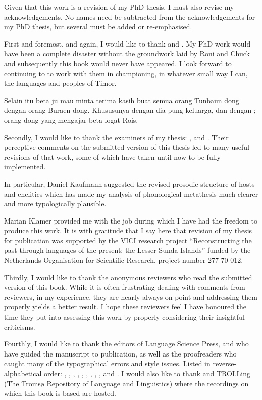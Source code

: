 \begin{refsection}

Given that this work is a revision of my PhD thesis,
I must also revise my acknowledgements.
No names need be subtracted from the acknowledgements for my PhD thesis,
but several must be added or re-emphasised.

First and foremost, and again, I would like to thank
 and .
My PhD work would have been a complete disaster without
the groundwork laid by Roni and Chuck and
subsequently this book would never have appeared.
I look forward to continuing to to work with them in championing,
in whatever small way I can, the languages and peoples of Timor.

Selain itu beta ju mau minta terima kasih buat semua
orang Tunbaun dong dengan orang Buraen dong.
Khususunya  dengan dia pung keluarga,
dan  dengan ;
orang dong yang mengajar beta logat Ro{\Q}is.

Secondly, I would like to thank the examiners of my thesis:
,  and .
Their perceptive comments on the submitted version of this thesis
led to many useful revisions of that work, some of which have
taken until now to be fully implemented.

In particular, Daniel Kaufmann suggested
the revised prosodic structure of hosts and enclitics which
has made my analysis of phonological metathesis much clearer
and more typologically plausible.

Marian Klamer provided me with the job during
which I have had the freedom to produce this work.
It is with gratitude that I say here that
revision of my thesis for publication was supported
by the VICI research project ``Reconstructing the past
through languages of the present: the Lesser Sunda Islands''
funded by the Netherlands Organisation for Scientific
Research, project number 277-70-012.

Thirdly, I would like to thank the anonymous reviewers
who read the submitted version of this book.
While it is often frustrating dealing with comments from reviewers,
in my experience, they are nearly always on point and 
addressing them properly yields a better result.
I hope these reviewers feel I have honoured the time
they put into assessing this work by properly
considering their insightful criticisms.

Fourthly, I would like to thank the editors of Language
Science Press,  and 
who have guided the manuscript to publication,
as well as the proofreaders who caught many of the
typographical errors and style issues.
Listed in reverse-alphabetical order:
, ,
, , ,
, ,
, ,
and .
I would also like to thank 
and TROLLing (The Tromsø Repository of Language and Linguistics) 
where the recordings on which this book is based are hosted.


\end{refsection}
